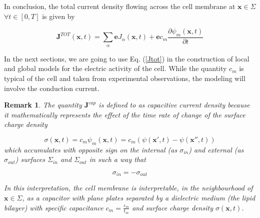 \documentclass[12pt, a4paper]{report}
\newtheorem{remark}{Remark}
\begin{document}
In conclusion, the total current density flowing across the cell membrane at $ \textbf{x} \in \Sigma$ $\forall t \in [0,T]$ is given by

\begin{equation}
\textbf{J}^{TOT}(\textbf{x},t) = \sum_{\alpha} \textbf{e} J_{\alpha}(\textbf{x},t) + \textbf{e} c_m \frac{\partial \psi_m (\textbf{x},t)}{\partial t} \label{Jtot}
\end{equation}

In the next sections, we are going to use Eq. (\ref*{Jtot}) in the construction of local and global models for the electric activity of the cell. While the quantity $c_m$ is typical of the cell and taken from experimental observations, the modeling will involve the conduction current. 

\begin{remark}
	The quantity $\textbf{J}^{cap}$ is defined to as capacitive current density because it mathematically represents the effect of the time rate of change of the surface charge density 
	
	$$ \sigma(\textbf{x},t) = c_m \psi_m (\textbf{x},t) = c_m \left(\psi(\textbf{x}',t) - \psi(\textbf{x}'',t) \right)$$
	which accumulates with opposite sign on the internal (as $\sigma_{in}$) and external (as $\sigma_{out}$) surfaces $\Sigma_{in}$ and $\Sigma_{out}$ in such a way that
	
	$$ \sigma_{in} = -\sigma_{out} $$
	
	In this interpretation, the cell membrane is interpretable, in the neighbourhood of $ \textbf{x} \in \Sigma$, as a capacitor with plane plates separated by a dielectric medium (the lipid bilayer) with specific capacitance $ c_m = \frac{\varepsilon_m}{t_m}$ and surface charge density $\sigma(\textbf{x},t)$.
\end{remark}
\end{document}
